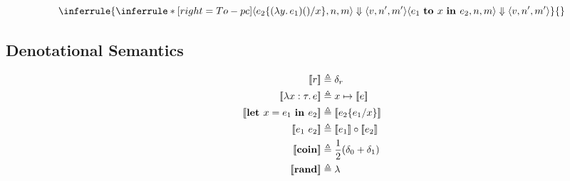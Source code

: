 \documentclass{article}
\begin{document}
			\begin{equation*}
				\inferrule{
				\inferrule*[right={\sc To-pc}]
				{\langle e_2\{(\lambda y.\, e_1) () / x\}, n, m \rangle \Downarrow \langle v, n', m' \rangle}
				{\langle e_1 \text{ \bf to } x \text{ \bf in } e_2, n, m \rangle  
				\Downarrow \langle v, n', m' \rangle}}
				{}
			\end{equation*}


	\subsection{Denotational Semantics}
		\begin{equation*}
		\begin{split}
			[\![r]\!] &\triangleq \delta_r \\
			[\![\lambda x : \tau .\, e]\!] &\triangleq x \mapsto [\![e]\!] \\
			[\![\text{\bf let } x = e_1 \text{ \bf in } e_2]\!] &\triangleq [\![e_2\{e_1 / x\}]\!] \\
			[\![e_1 \text{ } e_2]\!] &\triangleq [\![e_1]\!] \circ [\![e_2]\!] \\
			[\![{\bf coin}]\!] &\triangleq \frac{1}{2}(\delta_0 + \delta_1) \\
			[\![{\bf rand}]\!] &\triangleq \lambda \\
		\end{split}
	\end{equation*}
	
\end{document}
